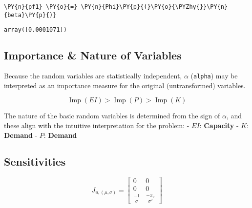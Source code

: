     \begin{tcolorbox}[breakable, size=fbox, boxrule=1pt, pad at break*=1mm,colback=cellbackground, colframe=cellborder]
\begin{Verbatim}[commandchars=\\\{\}]
\PY{n}{pf1} \PY{o}{=} \PY{n}{Phi}\PY{p}{(}\PY{o}{\PYZhy{}}\PY{n}{beta}\PY{p}{)}
\end{Verbatim}
\end{tcolorbox}

            \begin{tcolorbox}[breakable, size=fbox, boxrule=.5pt, pad at break*=1mm, opacityfill=0]
\begin{Verbatim}[commandchars=\\\{\}]
array([0.0001071])
\end{Verbatim}
\end{tcolorbox}
        
    \hypertarget{importance-nature-of-variables}{%
\subsection{Importance \& Nature of
Variables}\label{importance-nature-of-variables}}

    Because the random variables are statistically independent, \(\alpha\)
(\texttt{alpha}) may be interpreted as an importance measure for the
original (untransformed) variables.

\[\operatorname{Imp}(EI) > \operatorname{Imp}(P) > \operatorname{Imp}(K)\]

The nature of the basic random variables is determined from the sign of
\(\alpha\), and these align with the intuitive interpretation for the
problem: - \(EI\): \textbf{Capacity} - \(K\): \textbf{Demand} - \(P\):
\textbf{Demand}

    \hypertarget{sensitivities}{%
\subsection{Sensitivities}\label{sensitivities}}

\[J_{u,(\mu,\sigma)}=\left[\begin{array}{cc}
0 & 0 \\
0 & 0 \\
\frac{-1}{\sigma} & \frac{-x_{2}}{\sigma^{2}}
\end{array}\right]\]

